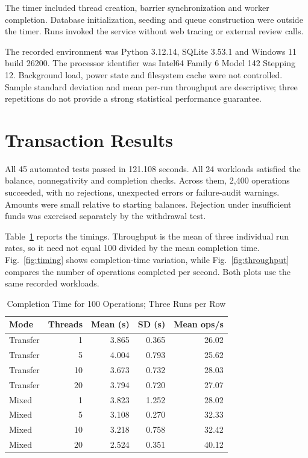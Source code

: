 \documentclass[conference]{IEEEtran}
\begin{document}
The timer included thread creation, barrier synchronization and worker completion. Database initialization, seeding and queue construction were outside the timer. Runs invoked the service without web tracing or external review calls.

The recorded environment was Python 3.12.14, SQLite 3.53.1 and Windows 11 build 26200. The processor identifier was Intel64 Family 6 Model 142 Stepping 12. Background load, power state and filesystem cache were not controlled. Sample standard deviation and mean per-run throughput are descriptive; three repetitions do not provide a strong statistical performance guarantee.

\section{Transaction Results}
All 45 automated tests passed in 121.108 seconds. All 24 workloads satisfied the balance, nonnegativity and completion checks. Across them, 2,400 operations succeeded, with no rejections, unexpected errors or failure-audit warnings. Amounts were small relative to starting balances. Rejection under insufficient funds was exercised separately by the withdrawal test.

Table~\ref{tab:timings} reports the timings. Throughput is the mean of three individual run rates, so it need not equal 100 divided by the mean completion time. Fig.~\ref{fig:timing} shows completion-time variation, while Fig.~\ref{fig:throughput} compares the number of operations completed per second. Both plots use the same recorded workloads.

\begin{table}[t]
\caption{Completion Time for 100 Operations; Three Runs per Row}
\label{tab:timings}
\centering\footnotesize
\begin{tabular}{@{}lrrrr@{}}
\toprule
Mode & Threads & Mean (s) & SD (s) & Mean ops/s\\
\midrule
Transfer & 1 & 3.865 & 0.365 & 26.02\\
Transfer & 5 & 4.004 & 0.793 & 25.62\\
Transfer & 10 & 3.673 & 0.732 & 28.03\\
Transfer & 20 & 3.794 & 0.720 & 27.07\\
Mixed & 1 & 3.823 & 1.252 & 28.02\\
Mixed & 5 & 3.108 & 0.270 & 32.33\\
Mixed & 10 & 3.218 & 0.758 & 32.42\\
Mixed & 20 & 2.524 & 0.351 & 40.12\\
\bottomrule
\end{tabular}
\end{table}
\end{document}
